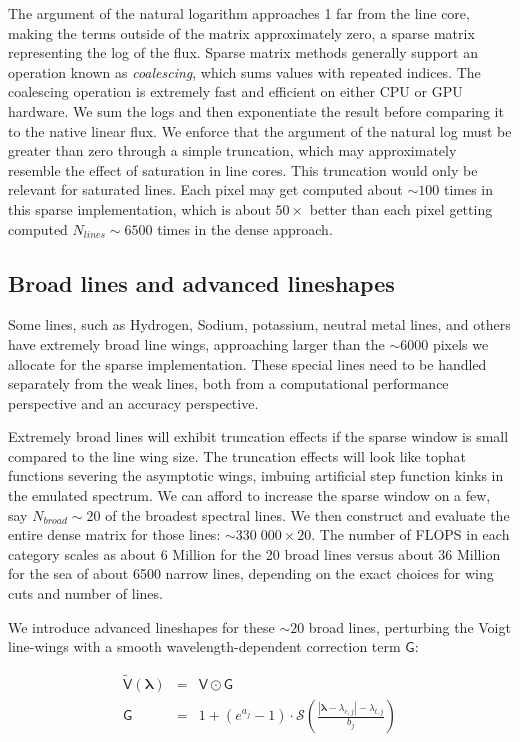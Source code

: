 \documentclass[modern]{aastex631}
\begin{document}
The argument of the natural logarithm approaches 1 far from the line core, making the terms outside of the matrix approximately zero, a sparse matrix representing the log of the flux. Sparse matrix methods generally support an operation known as \emph{coalescing}, which sums values with repeated indices. The coalescing operation is extremely fast and efficient on either CPU or GPU hardware. We sum the logs and then exponentiate the result before comparing it to the native linear flux. We enforce that the argument of the natural log must be greater than zero through a simple truncation, which may approximately resemble the effect of saturation in line cores. This truncation would only be relevant for saturated lines. Each pixel may get computed about $\sim100$ times in this sparse implementation, which is about $50\times$ better than each pixel getting computed $N_{lines}\sim6500$ times in the dense approach.


\subsection{Broad lines and advanced lineshapes}

Some lines, such as Hydrogen, Sodium, potassium, neutral metal lines, and others have extremely broad line wings, approaching larger than the $\sim6000$ pixels we allocate for the sparse implementation. These special lines need to be handled separately from the weak lines, both from a computational performance perspective and an accuracy perspective.

Extremely broad lines will exhibit truncation effects if the sparse window is small compared to the line wing size. The truncation effects will look like tophat functions severing the asymptotic wings, imbuing artificial step function kinks in the emulated spectrum. We can afford to increase the sparse window on a few, say $N_{broad}\sim20$ of the broadest spectral lines. We then construct and evaluate the entire dense matrix for those lines: $\sim 330\;000 \times 20$. The number of FLOPS in each category scales as about 6 Million for the 20 broad lines versus about 36 Million for the sea of about 6500 narrow lines, depending on the exact choices for wing cuts and number of lines.

We introduce advanced lineshapes for these $\sim20$ broad lines, perturbing the Voigt line-wings with a smooth wavelength-dependent correction term $\mathsf{G}$:

\begin{eqnarray}
    \mathsf{\tilde{V}(\bm{\lambda})} &=& \mathsf{V} \odot \mathsf{G}\\
    \mathsf{G} &=& 1 + (e^{a_j} - 1) \cdot \mathcal{S}\left(\frac{|\bm{\lambda}-\lambda_{c,j}| - \lambda_{t, j}}{b_j}\right)
\end{eqnarray}
\end{document}
